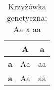 
\begin{table}[htbp]
\centering
\begin{tabular}{c|c|c|}
\cline{2-3}
                                                         & \cellcolor[HTML]{C0C0C0}\textbf{A} & \cellcolor[HTML]{C0C0C0}\textbf{a} \\ \hline
\multicolumn{1}{|c|}{\cellcolor[HTML]{C0C0C0}\textbf{a}} & Aa                                 & aa                                 \\ \hline
\multicolumn{1}{|c|}{\cellcolor[HTML]{C0C0C0}\textbf{a}} & Aa                                 & aa                                 \\ \hline
\end{tabular}
\label{tab:krzyzowka}
\caption{Krzyżówka genetyczna: Aa x aa}
\end{table}
